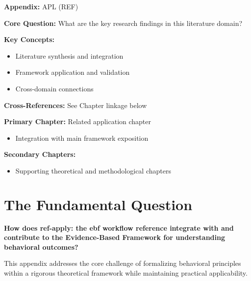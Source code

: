 \begin{tcolorbox}[colback=blue!5!white, colframe=blue!75!black,
    title=Quick Reference: Appendix APL]
\textbf{Appendix:} APL (REF)

\textbf{Core Question:} What are the key research findings in this literature domain?

\textbf{Key Concepts:}
\begin{itemize}[nosep]
\item Literature synthesis and integration
\item Framework application and validation
\item Cross-domain connections
\end{itemize}

\textbf{Cross-References:} See Chapter linkage below
\end{tcolorbox}


\begin{tcolorbox}[colback=purple!5!white, colframe=purple!75!black,
    title=Chapter Linkage]

\textbf{Primary Chapter:} Related application chapter
\begin{itemize}[nosep]
\item Integration with main framework exposition
\end{itemize}

\textbf{Secondary Chapters:}
\begin{itemize}[nosep]
\item Supporting theoretical and methodological chapters
\end{itemize}

\end{tcolorbox}

\section{The Fundamental Question}
\label{sec:apl-fundamental}

\begin{tcolorbox}[
    colback=red!5!white,
    colframe=red!75!black,
    title={\textbf{Fundamental Question}}
]
\textbf{How does ref-apply: the ebf workflow reference integrate with and contribute to the
Evidence-Based Framework for understanding behavioral outcomes?}

This appendix addresses the core challenge of formalizing behavioral principles
within a rigorous theoretical framework while maintaining practical applicability.
\end{tcolorbox}


